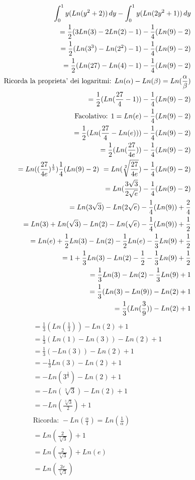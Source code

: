 \documentclass{article}
\begin{document}
\begin{align*}
    \int_0^1 y(Ln(y^2+2)) \,dy - \int_0^1 y(Ln(2y^2+1)) \,dy \\
    = \frac{1}{2}(3Ln(3)-2Ln(2)-1) -\frac{1}{4}(Ln(9)-2) \\
    = \frac{1}{2}(Ln(3^3)-Ln(2^2)-1) -\frac{1}{4}(Ln(9)-2)\\
    = \frac{1}{2}(Ln(27)-Ln(4)-1) -\frac{1}{4}(Ln(9)-2)\\
    \text{Ricorda la proprieta' dei logaritmi: } Ln(\alpha)-Ln(\beta)=Ln(\frac{\alpha}{\beta}) \\
    = \frac{1}{2}(Ln(\frac{27}{4}-1)) -\frac{1}{4}(Ln(9)-2)\\
    \text{Facolativo: } 1=Ln(e) -\frac{1}{4}(Ln(9)-2)\\
    = \frac{1}{2}(Ln(\frac{27}{4}-Ln(e))) -\frac{1}{4}(Ln(9)-2)\\
    = \frac{1}{2}(Ln(\frac{27}{4e})) -\frac{1}{4}(Ln(9)-2)\\
    = Ln((\frac{27}{4e})^\frac{1}{3}) \-\frac{1}{4}(Ln(9)-2)\
    = Ln(\sqrt[2]{\frac{27}{4e}}) -\frac{1}{4}(Ln(9)-2)\\
    = Ln(\frac{3\sqrt{3}}{2\sqrt{e}})-\frac{1}{4}(Ln(9)-2) \\
    = Ln(3\sqrt{3})-Ln(2\sqrt{e})-\frac{1}{4}(Ln(9))+\frac{2}{4} \\
    = Ln(3)+Ln(\sqrt{3})-Ln(2)-Ln(\sqrt{e})-\frac{1}{4}(Ln(9))+\frac{1}{2} \\
    = Ln(e)+\frac{1}{2}Ln(3)-Ln(2)-\frac{1}{2}Ln(e)-\frac{1}{3}Ln(9)+\frac{1}{2} \\
    = 1 + \frac{1}{3}Ln(3)-Ln(2)-\frac{1}{2}-\frac{1}{3}Ln(9)+\frac{1}{2} \\
    = \frac{1}{3}Ln(3)-Ln(2)-\frac{1}{3}Ln(9)+1\\
    = \frac{1}{3}(Ln(3)-Ln(9))-Ln(2)+1 \\
    = \frac{1}{3}(Ln(\frac{3}{9}))-Ln(2)+1 \\
\end{align*}
\begin{align*}
    = \frac{1}{3}(Ln(\frac{1}{3}))-Ln(2)+1 \\
    = \frac{1}{3}(Ln(1)-Ln(3))-Ln(2)+1 \\
    = \frac{1}{3}(-Ln(3))-Ln(2)+1\\
    = -\frac{1}{3}Ln(3)-Ln(2)+1 \\
    = -Ln(3^\frac{1}{3})-Ln(2)+1 \\
    = -Ln(\sqrt[3]{3})-Ln(2)+1 \\
    = -Ln(\frac{\sqrt[3]{3}}{2})+1 \\
    \text{Ricorda: }-Ln(\frac{\alpha}{1})=Ln(\frac{1}{\alpha}) \\
    = Ln(\frac{2}{\sqrt[3]{3}})+1 \\
    = Ln(\frac{2}{\sqrt[3]{3}})+Ln(e) \\
    = Ln(\frac{2e}{\sqrt[3]{3}})
\end{align*}
\end{document}
